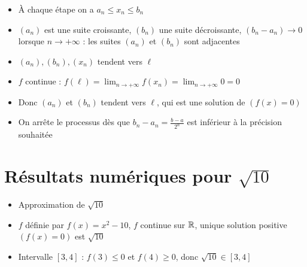 \begin{frame}

\begin{itemize}[<+->]
  \setlength{\itemsep}{5pt} 
  \item \`A chaque étape on a $a_n \le x_n \le b_n$

  \item $(a_n)$ est une suite croissante, $(b_n)$ une suite décroissante, 
  $(b_n-a_n) \to 0$ lorsque $n\to +\infty$ : les suites $(a_n)$ et $(b_n)$ sont adjacentes
  
  \item $(a_n), (b_n), (x_n)$ tendent vers $\ell$
  
  \item $f$ continue : $f(\ell)=\lim_{n\to +\infty} f(x_n)=\lim_{n\to +\infty} 0 =0$
  
  \item Donc $(a_n)$\! et \!$(b_n)$ tendent vers $\ell$, qui est une solution de $(f(x)=0)$  
  
  \item On arrête le processus dès que $b_n-a_n=\frac{b-a}{2^n}$ est inférieur à la précision souhaitée
  
\end{itemize}

\end{frame}





\section{Résultats numériques pour $\sqrt{10}$}

\begin{frame}
\begin{itemize}[<+->]
  \setlength{\itemsep}{7pt}
  \item Approximation de $\sqrt{10}$
  
  \item $f$ définie par $f(x)=x^2 - 10$, $f$ continue sur $\mathbb{R}$, 
  unique solution positive $(f(x)=0)$ est $\sqrt{10}$
  
  \item Intervalle $[3,4]$ : $f(3) \le 0$ et $f(4) \ge 0$, donc $\sqrt{10} \in [3,4]$
\end{itemize}
\end{frame}



